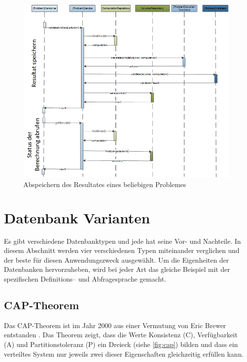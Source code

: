 \begin{figure}[h]
\centering
\includegraphics[scale=0.72]{images/visio/sequenz_diagramm_result.png}
\caption[Abspeichern des Resultates eines beliebigen Problemes]{Abspeichern des Resultates eines beliebigen Problemes \selfmade{}}
\label{fig:sequenz_diagramm_result}
\end{figure}

\section{Datenbank Varianten}\label{db_varianten}
Es gibt verschiedene Datenbanktypen und jede hat seine Vor- und Nachteile. In diesem Abschnitt werden vier verschiedenen Typen miteinander verglichen und der beste für diesen 
Anwendungszweck ausgewählt. Um die Eigenheiten der Datenbanken hervorzuheben, wird bei jeder Art das gleiche Beispiel mit der spezifischen Definitions-- und Abfragesprache gemacht.

\subsection{CAP-Theorem}\label{cap_theorem}
Das CAP-Theorem ist im Jahr 2000 aus einer Vermutung von Eric Brewer entstanden \cite{cap_brewer}. Das Theorem zeigt, dass die Werte Konsistenz (C), Verfügbarkeit (A) und Partitionstoleranz (P) ein 
Dreieck (siehe \autoref{fig:cap}) bilden und dass ein verteiltes System nur jeweils zwei dieser Eigenschaften gleichzeitig erfüllen kann.

